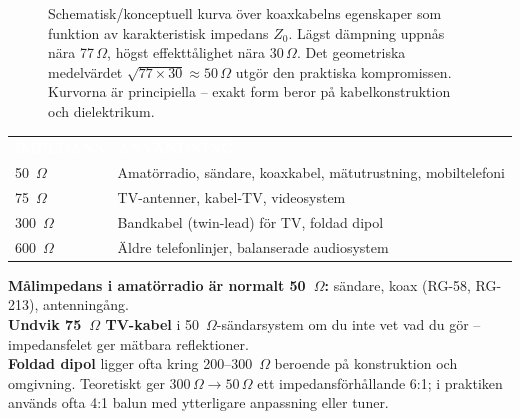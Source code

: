 \documentclass[a4paper,11pt,twoside]{book}
\newcommand{\emoji}[1]{{\emojifont #1}}
\newcommand{\tblhdr}[1]{\cellcolor{greydark}\textcolor{white}{\headingfont\bfseries\footnotesize\MakeUppercase{#1}}}
\begin{document}
\begin{figure}[htbp]
\caption{Schematisk/konceptuell kurva över koaxkabelns egenskaper som
funktion av karakteristisk impedans $Z_0$. Lägst dämpning uppnås
nära 77\,$\Omega$, högst effekttålighet nära 30\,$\Omega$.
Det geometriska medelvärdet $\sqrt{77 \times 30} \approx 50\,\Omega$
utgör den praktiska kompromissen. Kurvorna är principiella --
exakt form beror på kabelkonstruktion och dielektrikum.}
\label{fig:impedanskompromiss}
\end{figure}

\begin{center}
\begin{tabular}{L{2.5cm}L{8.0cm}}
\tblhdr{Impedans} & \tblhdr{Användning} \\
50~$\Omega$ & Amatörradio, sändare, koaxkabel, mätutrustning, mobiltelefoni \\
75~$\Omega$ & TV-antenner, kabel-TV, videosystem \\
300~$\Omega$ & Bandkabel (twin-lead) för TV, foldad dipol \\
600~$\Omega$ & Äldre telefonlinjer, balanserade audiosystem \\
\end{tabular}
\end{center}

\begin{bluebox}[title={\emoji{🔑} Nyckelsamband -- impedanser}]
\textbf{Målimpedans i amatörradio är normalt 50~$\Omega$:}
sändare, koax (RG-58, RG-213), antenningång.\\
\textbf{Undvik 75~$\Omega$ TV-kabel} i 50~$\Omega$-sändarsystem om du inte vet vad
du gör -- impedansfelet ger mätbara reflektioner.\\
\textbf{Foldad dipol} ligger ofta kring 200--300~$\Omega$ beroende på konstruktion
och omgivning. Teoretiskt ger 300\,$\Omega \rightarrow 50\,\Omega$ ett
impedansförhållande 6:1; i praktiken används ofta 4:1 balun med
ytterligare anpassning eller tuner.
\end{bluebox}
\end{document}
